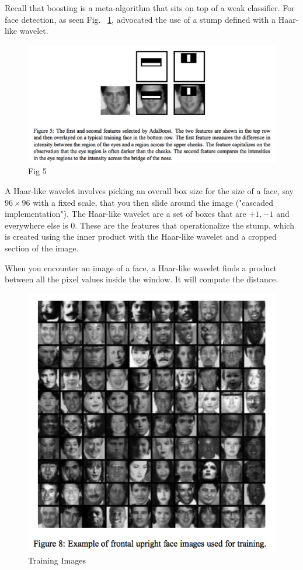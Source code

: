 \documentclass[a4paper]{article}
\begin{document}
Recall that boosting is a meta-algorithm that sits on top of a weak classifier. For face detection, as seen Fig. ~\ref{fig:boost5}, advocated the use of a stump defined with a Haar-like wavelet.

\begin{figure}
\centering
\includegraphics[width=1.0\textwidth]{fig5.png}
\caption{\label{fig:boost5}Fig 5}
\end{figure}

A Haar-like wavelet involves picking an overall box size for the size of a face, say $96 \times 96$ with a fixed scale, that you then slide around the image ("cascaded implementation").  The Haar-like wavelet are a set of boxes that are $+1, -1$ and everywhere else is $0$.  These are the features that operationalize the stump, which is created using the inner product with the Haar-like wavelet and a cropped section of the image.  

When you encounter an image of a face, a Haar-like wavelet finds a product between all the pixel values inside the window. It will compute the distance. 

\begin{figure}
\centering
\includegraphics[width=1.0\textwidth]{fig8.png}
\caption{\label{fig:boost6}Training Images}
\end{figure}
\end{document}
